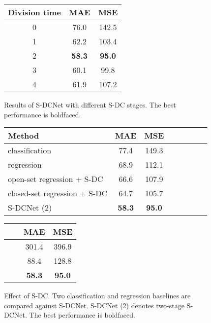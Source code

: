\documentclass[10pt,twocolumn,letterpaper]{article}
\begin{document}
	\begin{figure*}
		\begin{minipage}{\textwidth}
			
\makeatletter{}\makeatother
			\begin{minipage}{.23\textwidth}
				\centering
				\footnotesize
				\begin{tabular}{|c|c|c|}
					\hline
					Division time & MAE &MSE\\
					\hline
					0 & 76.0 & 142.5\\		  
					1 & 62.2 & 103.4\\
					2 & \textbf{58.3} & \textbf{95.0}\\
					3 & 60.1 & 99.8\\	 
					4 & 61.9 & 107.2\\
					\hline
				\end{tabular}
				\vspace{1pt}
				\caption{Results of S-DCNet with different S-DC stages. The best performance is boldfaced.\newline}
				\label{tab:div_time}
\end{minipage}
			\hfill
\makeatletter{}\makeatother
			\begin{minipage}{.34\textwidth}
				\centering
				\footnotesize
				\begin{tabular}{|l|c|c|c|c|c|c|c|}
					\hline
					Method           & MAE &MSE\\
					\hline
					
					classification   & 77.4 &  149.3  \\   
					regression       & 68.9 & 112.1   \\
					open-set regression + S-DC & 66.6 & 107.9	   \\  
					closed-set regression + S-DC  &64.7  & 105.7   \\ \hline
					S-DCNet (2)      & \textbf{58.3} & \textbf{95.0}\\
					
					\hline
				\end{tabular}
				\vspace{5pt}
				\caption{Effect of S-DC. Two classification and regression baselines are compared against S-DCNet. S-DCNet (2) denotes two-stage S-DCNet. The best performance is boldfaced.}
\label{tab:reg_cls_div} 
			\end{minipage}
			\hfill
\makeatletter{}\makeatother
			\begin{minipage}{.34\textwidth}
				\centering
				\footnotesize
				\addtolength{\tabcolsep}{4.5pt}
				\begin{tabular}{|c|c|c|c|}
\hline
					  &   & MAE   &MSE\\
					\hline
					&\checkmark& 301.4& 396.9  \\
					\checkmark&          &88.4	 & 128.8   \\
					\checkmark &\checkmark& \textbf{58.3} & \textbf{95.0}\\
					

\end{tabular}
\end{minipage}
\end{minipage}
\end{figure*}
\end{document}
